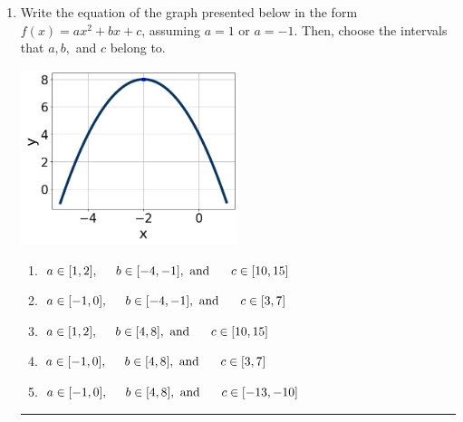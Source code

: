 \documentclass[14pt]{extbook}
\newcommand{\litem}[1]{\item#1\hspace*{-1cm}\rule{\textwidth}{0.4pt}}
\begin{document}
\begin{enumerate}
{\begin{enumerate}[label=\Alph*.]
\end{enumerate} }
\litem{
Write the equation of the graph presented below in the form $f(x)=ax^2+bx+c$, assuming  $a=1$ or $a=-1$. Then, choose the intervals that $a, b,$ and $c$ belong to.
\begin{center}
    \includegraphics[width=0.5\textwidth]{../Figures/quadraticGraphToEquationCopyA.png}
\end{center}
\begin{enumerate}[label=\Alph*.]
\item \( a \in [1, 2], \hspace*{5mm} b \in [-4, -1], \text{ and } \hspace*{5mm} c \in [10, 15] \)
\item \( a \in [-1, 0], \hspace*{5mm} b \in [-4, -1], \text{ and } \hspace*{5mm} c \in [3, 7] \)
\item \( a \in [1, 2], \hspace*{5mm} b \in [4, 8], \text{ and } \hspace*{5mm} c \in [10, 15] \)
\item \( a \in [-1, 0], \hspace*{5mm} b \in [4, 8], \text{ and } \hspace*{5mm} c \in [3, 7] \)
\item \( a \in [-1, 0], \hspace*{5mm} b \in [4, 8], \text{ and } \hspace*{5mm} c \in [-13, -10] \)


\end{enumerate}}
\end{enumerate}
\end{document}
